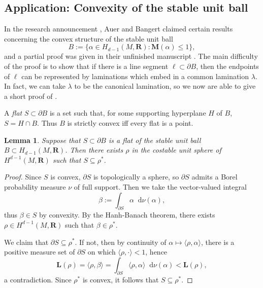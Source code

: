 \documentclass[reqno,11pt]{amsart}
\newcommand{\RR}{\mathbf{R}}
\newcommand*\dif{\mathop{}\!\mathrm{d}}
\newcommand{\Mass}{\mathbf M}
\newcommand{\Comass}{\mathbf L}
\newcommand{\dfn}[1]{\emph{#1}\index{#1}}
\newtheorem{lemma}[theorem]{Lemma}
\theoremstyle{definition}
\numberwithin{equation}{section}
\begin{document}
\subsection{Application: Convexity of the stable unit ball}\label{convexity sec}
In the research announcement \cite{Auer01}, Auer and Bangert claimed certain results concerning the convex structure of the stable unit ball
$$B := \{\alpha \in H_{d - 1}(M, \RR): \Mass(\alpha) \leq 1\},$$
and a partial proof was given in their unfinished manuscript \cite{Auer12}.
The main difficulty of the proof is to show that if there is a line segment $\ell \subset \partial B$, then the endpoints of $\ell$ can be represented by laminations which embed in a common lamination $\lambda$.
In fact, we can take $\lambda$ to be the canonical lamination, so we now are able to give a short proof of \cite[Theorems 6 and 7]{Auer01}.

A \dfn{flat} $S \subset \partial B$ is a set such that, for some supporting hyperplane $H$ of $B$, $S = H \cap B$.
Thus $B$ is strictly convex iff every flat is a point.

\begin{lemma} \label{flats have dual classes}
Suppose that $S \subset \partial B$ is a flat of the stable unit ball $B \subset H_{d - 1}(M, \RR)$.
Then there exists $\rho$ in the costable unit sphere of $H^{d - 1}(M, \RR)$ such that $S \subseteq \rho^*$.
\end{lemma}
\begin{proof}
Since $S$ is convex, $\partial S$ is topologically a sphere, so $\partial S$ admits a Borel probability measure $\nu$ of full support.
Then we take the vector-valued integral 
$$\beta := \int_{\partial S} \alpha \dif \nu(\alpha),$$
thus $\beta \in S$ by convexity.
By the Hanh-Banach theorem, there exists $\rho \in H^{d - 1}(M, \RR)$ such that $\beta \in \rho^*$.

We claim that $\partial S \subseteq \rho^*$.
If not, then by continuity of $\alpha \mapsto \langle \rho, \alpha\rangle$, there is a positive measure set of $\partial S$ on which $\langle \rho, \cdot\rangle < 1$, hence
$$\Comass(\rho) = \langle \rho, \beta\rangle = \int_{\partial S} \langle \rho, \alpha\rangle \dif \nu(\alpha) < \Comass(\rho),$$
a contradiction.
Since $\rho^*$ is convex, it follows that $S \subseteq \rho^*$.
\end{proof}
\end{document}
